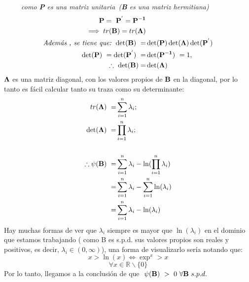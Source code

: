 \documentclass[12pt]{article}
\newcommand{\real}{\mathbb{R}}
\newcommand{\noi}{\noindent}
\newcommand{\beas}{\begin{eqnarray*}}
\newcommand{\eeas}{\end{eqnarray*}}
\begin{document}
\ \ \ \ \ {\it como {\bf P} es una matriz unitaria\ }{\it ({\bf B} es una matriz hermitiana) }\\ 
\beas
{\bf P} = \ {\bf P^{'}} ={\bf P^{-1}}& \\ 
\implies tr({\bf B}) = tr({\bf \Lambda})&\\ 
\text{\it Adem\'as , se tiene que: }
\det({\bf B})\ =&\det({\bf P})\det({\bf \Lambda})\det({\bf P^{'}})\\
\det({\bf P})\ =\det({\bf P^{'}})\ =&\det({\bf P^{-1}})\ =1,\\ \therefore \ \det({\bf B}) =&\det({\bf \Lambda})\\
\eeas
\noi ${\bf \Lambda }$ es una matriz diagonal, con los valores propios de ${\bf B}$ en la diagonal, por lo tanto es f\'acil calcular tanto su traza como su determinante:
\beas
tr({\bf \Lambda})\  =& \sum_{i=1}^{n} \lambda_{i}; \\
\det({\bf \Lambda})\ =& \prod_{i=1}^{n} \lambda_{i};\\ \\
\therefore \psi({\bf B})\  =& \sum_{i=1}^{n} \lambda_{i} - \ln(\prod_{i=1}^{n} \lambda_{i})\\
\ =& \sum_{i=1}^{n} \lambda_{i} -\sum_{i=1}^{n} \ln(\lambda_{i})\\
\ =&\sum_{i=1}^{n} \lambda_{i} - \ln(\lambda_{i})\\
\eeas
\noi Hay muchas formas de ver que $\lambda_{i}$ siempre es mayor que $\ln(\lambda_{i})$ en el dominio que estamos trabajando ( como B es s.p.d. sus valores propios son reales y positivos, es decir, $\lambda_{i} \in (0,\infty)$), una forma de visualizarlo ser\'ia notando que:
$$x > \ln(x) \iff \exp^{x} > x$$
$$\forall x\in \real\backslash \{0\} $$ 
\noi Por lo tanto, llegamos a la conclusi\'on de que $\ \psi({\bf B})\ >\ 0 \ \forall {\bf B}\  s.p.d.$ \\ \\ \\
\noi{\bf 6.10}
\end{document}
